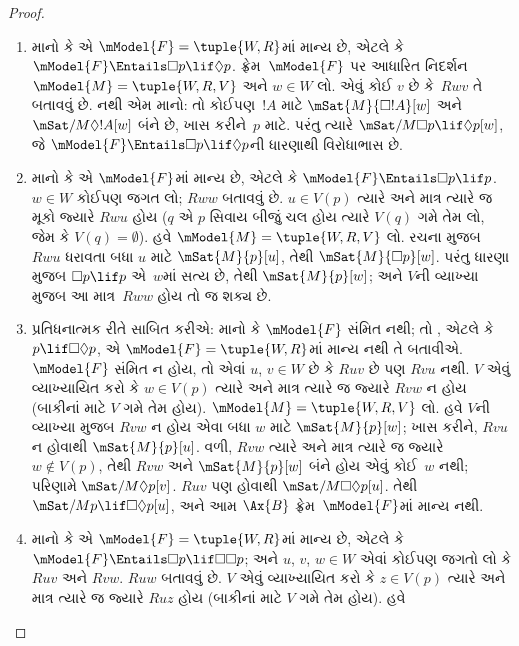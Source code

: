 \documentclass[../../../include/open-logic-section]{subfiles}
\begin{document}
\begin{proof}
  \begin{enumerate}
  \item માનો કે  એ $\mModel{F} = \tuple{W, R}$માં
    માન્ય છે, એટલે કે
    $\mModel{F} \Entails \Box p \lif \Diamond p$.
    ફ્રેમ~$\mModel{F}$ પર આધારિત નિદર્શન $\mModel{M} =
    \tuple{W, R, V}$ અને $w \in
    W$ લો. એવું કોઈ $v$ છે કે~$Rwv$ તે બતાવવું છે.
    નથી એમ માનો: તો કોઈપણ~$!A$ માટે
    $\mSat{M}{\Box !A}[w]$ અને
    $\mSat/{M}{\Diamond !A}[w]$ બંને છે, ખાસ કરીને~$p$
    માટે. પરંતુ ત્યારે $\mSat/{M}{\Box p \lif
      \Diamond p}[w]$, જે $\mModel{F}
    \Entails \Box p \lif \Diamond p$ની ધારણાથી વિરોધાભાસ છે.
  \item માનો કે  એ $\mModel{F}$માં માન્ય છે,
    એટલે કે $\mModel{F} \Entails \Box
    p \lif p$. $w \in W$ કોઈપણ જગત લો;
    $Rww$ બતાવવું છે. $u \in V(p)$ ત્યારે અને માત્ર
    ત્યારે જ મૂકો જ્યારે $Rwu$ હોય ($q$ એ $p$ સિવાય
    બીજું ચલ હોય ત્યારે $V(q)$ ગમે તેમ લો, જેમ કે
    $V(q) = \emptyset$). હવે
    $\mModel{M} = \tuple{W, R, V}$ લો. રચના મુજબ
    $Rwu$ ધરાવતા બધા $u$ માટે $\mSat{M}{p}[u]$,
    તેથી $\mSat{M}{\Box p}[w]$. પરંતુ ધારણા મુજબ
    $\Box p \lif p$ એ~$w$માં સત્ય છે, તેથી
    $\mSat{M}{p}[w]$; અને $V$ની વ્યાખ્યા મુજબ આ
    માત્ર~$Rww$ હોય તો જ શક્ય છે.
  \item પ્રતિધનાત્મક રીતે સાબિત કરીએ: માનો કે
    $\mModel{F}$ સંમિત નથી; તો , એટલે કે
    $p \lif \Box\Diamond p$, એ $\mModel{F}= \tuple{W, R}$માં
    માન્ય નથી તે બતાવીએ. $\mModel{F}$ સંમિત ન હોય,
    તો એવાં $u$, $v \in W$ છે કે $Ruv$ છે પણ
    $Rvu$ નથી. $V$ એવું વ્યાખ્યાયિત કરો કે
    $w \in V(p)$ ત્યારે અને માત્ર ત્યારે જ જ્યારે
    $Rvw$ ન હોય (બાકીનાં માટે $V$ ગમે તેમ હોય).
    $\mModel{M} =\tuple{W, R,
      V}$ લો. હવે $V$ની વ્યાખ્યા મુજબ $Rvw$ ન હોય
    એવા બધા $w$ માટે $\mSat{M}{p}[w]$; ખાસ કરીને,
    $Rvu$ ન હોવાથી $\mSat{M}{p}[u]$. વળી,
    $Rvw$ ત્યારે અને માત્ર ત્યારે જ જ્યારે
    $w \notin V(p)$, તેથી $Rvw$ અને
    $\mSat{M}{p}[w]$ બંને હોય એવું કોઈ~$w$ નથી;
    પરિણામે $\mSat/{M}{\Diamond p}[v]$. $Ruv$
    પણ હોવાથી $\mSat/{M}{\Box\Diamond p}[u]$.
    તેથી $\mSat/{M}{p \lif
      \Box\Diamond p}[u]$, અને આમ $\Ax{B}$
    ફ્રેમ~$\mModel{F}$માં માન્ય નથી.
  \item માનો કે  એ $\mModel{F} = \tuple{W,R}$માં
    માન્ય છે, એટલે કે
    $\mModel{F} \Entails \Box p \lif \Box\Box p$;
    અને $u$, $v$, $w \in W$ એવાં કોઈપણ જગતો લો
    કે $Ruv$ અને $Rvw$. $Ruw$ બતાવવું છે.
    $V$ એવું વ્યાખ્યાયિત કરો કે $z \in V(p)$ ત્યારે
    અને માત્ર ત્યારે જ જ્યારે $Ruz$ હોય (બાકીનાં
    માટે $V$ ગમે તેમ હોય). હવે

\end{enumerate}
\end{proof}
\end{document}
